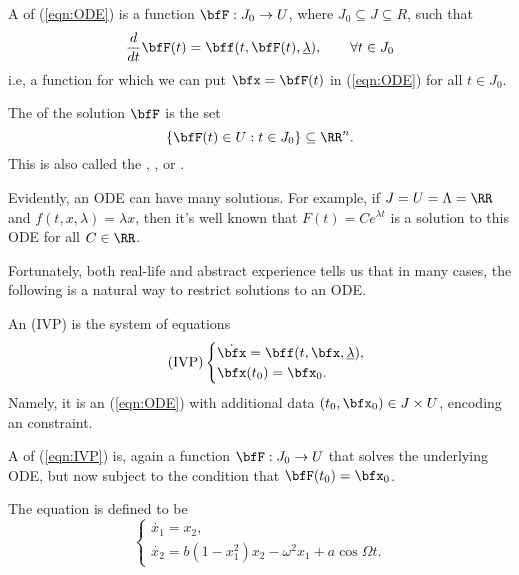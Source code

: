 \documentclass{article}
\newcommand*\ullam{\underline{\lambda}}
\begin{document}
\begin{definition}
A  of (\ref{eqn:ODE}) is a function $\bfF: J_0 \to U$, where $J_0 \subseteq J \subseteq R$, such that 
    \[
        \frac{d}{dt}\bfF(t)
        =
        \bff(t, \bfF(t), \ullam),\qquad 
        \forall t \in J_0
    \]
    i.e, a function for which we can put $\bfx = \bfF(t)$ in (\ref{eqn:ODE}) for all $t \in J_0$.

    The  of the solution $\bfF$ is the set
    \[
        \{
            \bfF(t) \in U: t \in J_0
        \}
        \subseteq \RR^n.
    \]
    This is also called the , , or .
\end{definition}

Evidently, an ODE can have many solutions.
For example, if $J = U = \Lambda = \RR$ and $f(t,x,\lambda) = \lambda x$, then it's well known that $F(t) = Ce^{\lambda t}$ is a solution to this ODE for all $C \in \RR$.

Fortunately, both real-life and abstract experience tells us that in many cases, the following is a natural way to restrict solutions to an ODE.

\begin{definition}
    An  (IVP) is the system of equations
    \begin{equation}
        \label{eqn:IVP}
        \tag{IVP}
        \begin{cases}
            \dot\bfx = \bff(t, \bfx, \ullam), \\
            \bfx(t_0) = \bfx_0.
        \end{cases}
    \end{equation}
    Namely, it is an (\ref{eqn:ODE}) with additional data $(t_0,\bfx_0) \in J \times U$, encoding an  constraint.

    A  of (\ref{eqn:IVP}) is, again a function $\bfF: J_0 \to U$ that solves the underlying ODE, but now subject to the condition that $\bfF(t_0) = \bfx_0$.
\end{definition}

\begin{example}
    The  equation is defined to be
    \begin{equation}
        \label{eqn:ForcedVanDerPol}
        \tag{fVdP}
        \begin{cases}
            \dot{x_1} = x_2, \\
            \dot{x_2} = b(1-x_1^2)x_2- \omega^2x_1 + a \cos \Omega t.
        \end{cases}
    \end{equation}
\end{example}
\end{document}
